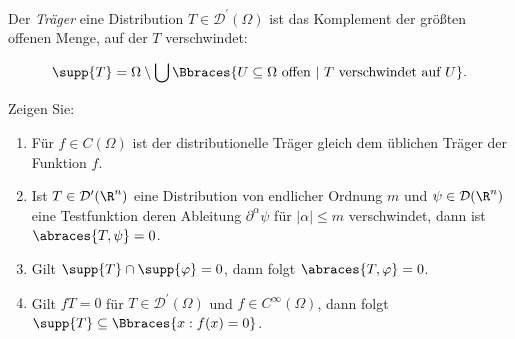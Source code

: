 
\begin{exercise}

Der \textit{Träger} eine Distribution $T \in \mathcal{D}^\prime(\Omega)$ ist das Komplement der größten offenen Menge, auf der $T$ verschwindet:

\begin{align*}
    \supp{T}
    =
    \Omega
    \setminus
    \bigcup
    \Bbraces
    {
        U \subseteq \Omega ~\text{offen}~ |~
        T ~\text{verschwindet auf}~ U
    }.
\end{align*}

Zeigen Sie:

\begin{enumerate}[label = (\roman*)]
    \item Für $f \in C(\Omega)$ ist der distributionelle Träger gleich dem üblichen Träger der Funktion $f$.
    \item Ist $T \in \mathcal{D}^\prime(\R^n)$ eine Distribution von endlicher Ordnung $m$ und $\psi \in \mathcal{D}(\R^n)$ eine Testfunktion deren Ableitung $\partial^\alpha \psi$ für $|\alpha| \leq m$ verschwindet, dann ist $\abraces{T, \psi} = 0$.
    \item Gilt $\supp{T} \cap \supp{\varphi} = 0$, dann folgt $\abraces{T, \varphi} = 0$.
    \item Gilt $fT = 0$ für $T \in \mathcal{D}^\prime(\Omega)$ und $f \in C^\infty(\Omega)$, dann folgt $\supp{T} \subseteq \Bbraces{x: f(x) = 0}$.
\end{enumerate}

\end{exercise}


